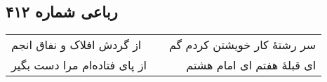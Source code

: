 \begin{center}
\section*{رباعی شماره ۴۱۲}
\label{sec:sh412}
\begin{longtable}{l p{0.5cm} r}
از گردش افلاک و نفاق انجم
&&
سر رشتهٔ کار خویشتن کردم گم
\\
از پای فتاده‌ام مرا دست بگیر
&&
ای قبلهٔ هفتم ای امام هشتم
\\
\end{longtable}
\end{center}
